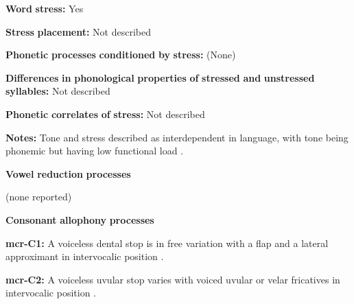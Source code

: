 \documentclass[output=paper]{langsci/langscibook}
\begin{document}
\begin{styleBody}
\textbf{Word} \textbf{stress:} Yes
\end{styleBody}

\begin{styleBody}
\textbf{Stress} \textbf{placement:} Not described
\end{styleBody}

\begin{styleBody}
\textbf{Phonetic} \textbf{processes} \textbf{conditioned} \textbf{by} \textbf{stress:} (None)
\end{styleBody}

\begin{styleBody}
\textbf{Differences} \textbf{in} \textbf{phonological} \textbf{properties} \textbf{of} \textbf{stressed} \textbf{and} \textbf{unstressed} \textbf{syllables:} Not described
\end{styleBody}

\begin{styleBody}
\textbf{Phonetic} \textbf{correlates} \textbf{of} \textbf{stress:} Not described
\end{styleBody}

\begin{styleBody}
\textbf{Notes:} Tone and stress described as interdependent in language, with tone being phonemic but having low functional load \citep[226]{Whitehead2004}. 
\end{styleBody}

\begin{styleBody}
\textbf{Vowel} \textbf{reduction} \textbf{processes}
\end{styleBody}

\begin{styleBody}
(none reported)
\end{styleBody}

\begin{styleBody}
\textbf{Consonant} \textbf{allophony} \textbf{processes}
\end{styleBody}

\begin{styleBody}
\textbf{mcr-C1:} A voiceless dental stop is in free variation with a flap and a lateral approximant in intervocalic position \citep[9]{Whitehead2004}.
\end{styleBody}

\begin{styleBody}
\textbf{mcr-C2:} A voiceless uvular stop varies with voiced uvular or velar fricatives in intervocalic position \citep[9]{Whitehead2004}.
\end{styleBody}
\end{document}

